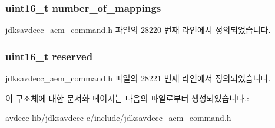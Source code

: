 \subsubsection[{\texorpdfstring{number\+\_\+of\+\_\+mappings}{number_of_mappings}}]{\setlength{\rightskip}{0pt plus 5cm}uint16\+\_\+t number\+\_\+of\+\_\+mappings}\hypertarget{structjdksavdecc__aem__command__add__audio__mappings_ac7db472c5622ef473d5d0a5c416d5531}{}\label{structjdksavdecc__aem__command__add__audio__mappings_ac7db472c5622ef473d5d0a5c416d5531}


jdksavdecc\+\_\+aem\+\_\+command.\+h 파일의 28220 번째 라인에서 정의되었습니다.

\subsubsection[{\texorpdfstring{reserved}{reserved}}]{\setlength{\rightskip}{0pt plus 5cm}uint16\+\_\+t reserved}\hypertarget{structjdksavdecc__aem__command__add__audio__mappings_a5a6ed8c04a3db86066924b1a1bf4dad3}{}\label{structjdksavdecc__aem__command__add__audio__mappings_a5a6ed8c04a3db86066924b1a1bf4dad3}


jdksavdecc\+\_\+aem\+\_\+command.\+h 파일의 28221 번째 라인에서 정의되었습니다.



이 구조체에 대한 문서화 페이지는 다음의 파일로부터 생성되었습니다.\+:\begin{DoxyCompactItemize}
\item 
avdecc-\/lib/jdksavdecc-\/c/include/\hyperlink{jdksavdecc__aem__command_8h}{jdksavdecc\+\_\+aem\+\_\+command.\+h}\end{DoxyCompactItemize}
